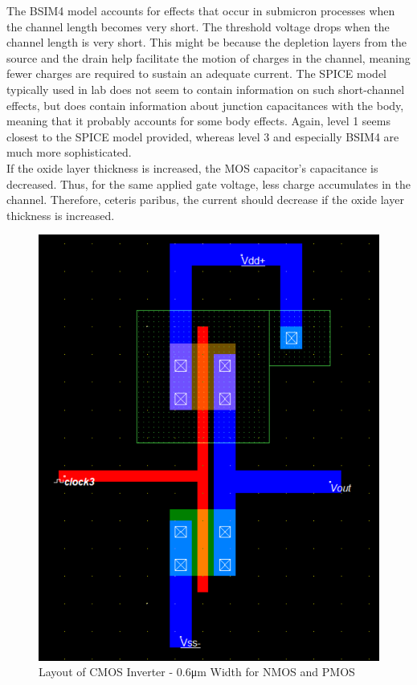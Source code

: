 The BSIM4 model accounts for effects that occur in submicron processes when the channel length becomes very short.
The threshold voltage drops when the channel length is very short.
This might be because the depletion layers from the source and the drain help facilitate the motion of charges in the channel, meaning fewer charges are required to sustain an adequate current.
The SPICE model typically used in lab does not seem to contain information on such short-channel effects, but does contain information about junction capacitances with the body, meaning that it probably accounts for some body effects.
Again, level 1 seems closest to the SPICE model provided, whereas level 3 and especially BSIM4 are much more sophisticated. \\

If the oxide layer thickness is increased, the MOS capacitor's capacitance is decreased.
Thus, for the same applied gate voltage, less charge accumulates in the channel.
Therefore, ceteris paribus, the current should decrease if the oxide layer thickness is increased. \\

\FloatBarrier

\begin{figure}[h!]
	\centering
	\includegraphics[scale=0.75]{./images/inverter_06nmos06pmos.PNG}
	\caption{Layout of CMOS Inverter - 0.6\si{\micro\meter} Width for NMOS and PMOS}
	\label{fig:inverter_layout}
\end{figure}

